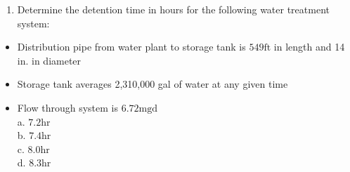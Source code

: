 \documentclass[10pt]{article}
\begin{document}
\begin{enumerate}
  \item Determine the detention time in hours for the following water treatment system:

\end{enumerate}

\begin{itemize}
  \item Distribution pipe from water plant to storage tank is $549 \mathrm{ft}$ in length and 14 in. in diameter

  \item Storage tank averages 2,310,000 gal of water at any given time

  \item Flow through system is $6.72 \mathrm{mgd}$\\
a. $7.2 \mathrm{hr}$\\
b. $7.4 \mathrm{hr}$\\
c. $8.0 \mathrm{hr}$\\
d. $8.3 \mathrm{hr}$

\end{itemize}
\end{document}
